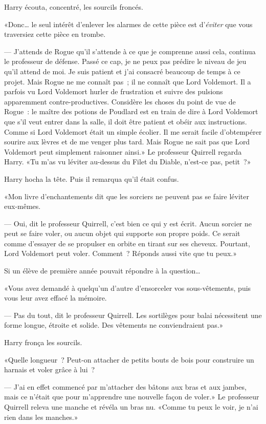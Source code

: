 Harry écouta, concentré, les sourcils froncés.

«Donc… le seul intérêt d'enlever les alarmes de cette pièce est d'\emph{éviter} que vous traversiez cette pièce en trombe.

--- J'attends de Rogue qu'il s'attende à ce que je comprenne aussi cela, continua le professeur de défense. Passé ce cap, je ne peux pas prédire le niveau de jeu qu'il attend de moi. Je suis patient et j'ai consacré beaucoup de temps à ce projet. Mais Rogue ne me connaît pas~; il ne connaît que Lord Voldemort. Il a parfois vu Lord Voldemort hurler de frustration et suivre des pulsions apparemment contre-productives. Considère les choses du point de vue de Rogue~: le maître des potions de Poudlard est en train de dire à Lord Voldemort que s'il veut entrer dans la salle, il doit être patient et obéir aux instructions. Comme si Lord Voldemort était un simple écolier. Il me serait facile d'obtempérer sourire aux lèvres et de me venger plus tard. Mais Rogue ne sait pas que Lord Voldemort peut simplement raisonner ainsi.» Le professeur Quirrell regarda Harry. «Tu m'as vu léviter au-dessus du Filet du Diable, n'est-ce pas, petit~?»

Harry hocha la tête. Puis il remarqua qu'il était confus.

«Mon livre d'enchantements dit que les sorciers ne peuvent pas se faire léviter eux-mêmes.

--- Oui, dit le professeur Quirrell, c'est bien ce qui y est écrit. Aucun sorcier ne peut se faire voler, ou aucun objet qui supporte son propre poids. Ce serait comme d'essayer de se propulser en orbite en tirant sur ses cheveux. Pourtant, Lord Voldemort peut voler. Comment~? Réponds aussi vite que tu peux.»

Si un élève de première année pouvait répondre à la question…

«Vous avez demandé à quelqu'un d'autre d'ensorceler vos sous-vêtements, puis vous leur avez effacé la mémoire.

--- Pas du tout, dit le professeur Quirrell. Les sortilèges pour balai nécessitent une forme longue, étroite et solide. Des vêtements ne conviendraient pas.»

Harry fronça les sourcils.

«Quelle longueur~? Peut-on attacher de petits bouts de bois pour construire un harnais et voler grâce à lui~?

--- J'ai en effet commencé par m'attacher des bâtons aux bras et aux jambes, mais ce n'était que pour m'apprendre une nouvelle façon de voler.» Le professeur Quirrell releva une manche et révéla un bras nu. «Comme tu peux le voir, je n'ai rien dans les manches.»

